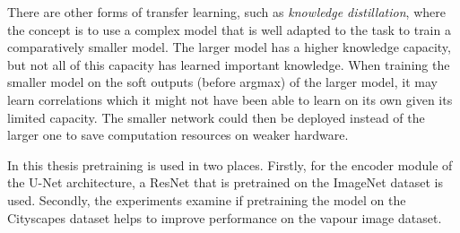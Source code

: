 There are other forms of transfer learning, such as \emph{knowledge distillation}, where the concept is to use a complex model that is well adapted to the task to train a comparatively smaller model. The larger model has a higher knowledge capacity, but not all of this capacity has learned important knowledge. When training the smaller model on the soft outputs (before argmax) of the larger model, it may learn correlations which it might not have been able to learn on its own given its limited capacity. The smaller network could then be deployed instead of the larger one to save computation resources on weaker hardware.

In this thesis pretraining is used in two places. Firstly, for the encoder module of the U-Net architecture, a ResNet that is pretrained on the ImageNet dataset is used. Secondly, the experiments examine if pretraining the model on the Cityscapes dataset helps to improve performance on the vapour image dataset.